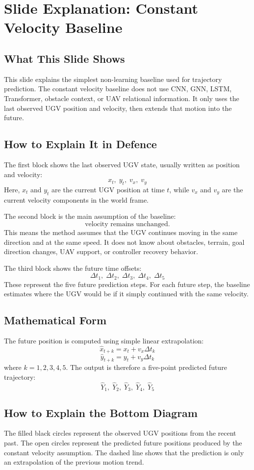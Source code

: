 \documentclass[11pt,a4paper]{article}
\begin{document}
\newpage
\section*{Slide Explanation: Constant Velocity Baseline}

\subsection*{What This Slide Shows}
This slide explains the simplest non-learning baseline used for trajectory
prediction. The constant velocity baseline does not use CNN, GNN, LSTM,
Transformer, obstacle context, or UAV relational information. It only uses the
last observed UGV position and velocity, then extends that motion into the
future.

\subsection*{How to Explain It in Defence}
The first block shows the last observed UGV state, usually written as position
and velocity:
\[
    x_t,\; y_t,\; v_x,\; v_y
\]
Here, \(x_t\) and \(y_t\) are the current UGV position at time \(t\), while
\(v_x\) and \(v_y\) are the current velocity components in the world frame.

The second block is the main assumption of the baseline:
\[
    \text{velocity remains unchanged.}
\]
This means the method assumes that the UGV continues moving in the same
direction and at the same speed. It does not know about obstacles, terrain,
goal direction changes, UAV support, or controller recovery behavior.

The third block shows the future time offsets:
\[
    \Delta t_1,\; \Delta t_2,\; \Delta t_3,\; \Delta t_4,\; \Delta t_5
\]
These represent the five future prediction steps. For each future step, the
baseline estimates where the UGV would be if it simply continued with the same
velocity.

\subsection*{Mathematical Form}
The future position is computed using simple linear extrapolation:
\[
    \hat{x}_{t+k} = x_t + v_x \Delta t_k
\]
\[
    \hat{y}_{t+k} = y_t + v_y \Delta t_k
\]
where \(k = 1,2,3,4,5\). The output is therefore a five-point predicted future
trajectory:
\[
    \hat{Y}_1,\; \hat{Y}_2,\; \hat{Y}_3,\; \hat{Y}_4,\; \hat{Y}_5
\]

\subsection*{How to Explain the Bottom Diagram}
The filled black circles represent the observed UGV positions from the recent
past. The open circles represent the predicted future positions produced by the
constant velocity assumption. The dashed line shows that the prediction is only
an extrapolation of the previous motion trend.
\end{document}
